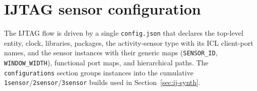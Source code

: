 \section{IJTAG sensor configuration}

The IJTAG flow is driven by a single \texttt{config.json} that declares the
top-level entity, clock, libraries, packages, the activity-sensor type with its
ICL client-port names, and the sensor instances with their generic maps
(\texttt{SENSOR\_ID}, \texttt{WINDOW\_WIDTH}), functional port maps, and
hierarchical paths. The \texttt{configurations} section groups instances into the
cumulative \texttt{1sensor}/\texttt{2sensor}/\texttt{3sensor} builds used in
Section~\ref{sec:ij-synth}.
